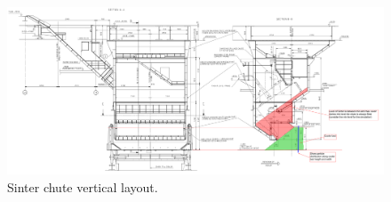 \begin{figure}[!htb]
\centering
\includegraphics[width=.80\columnwidth]{055sinterChuteVerticalLayout}
\caption[Sinter chute vertical layout]{Sinter chute vertical layout.}
\label{fig:055sinterChuteVerticalLayout}
\end{figure}